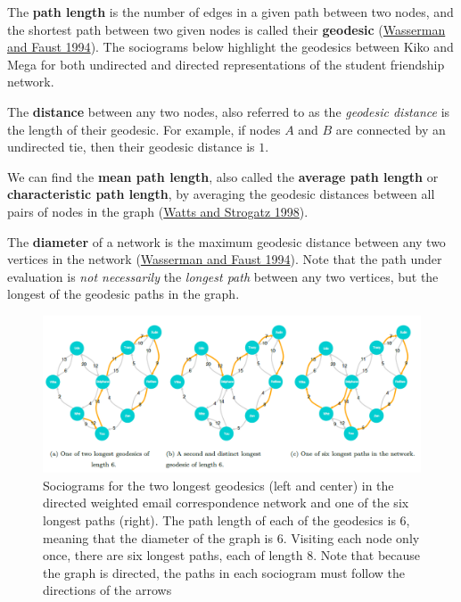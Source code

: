 \documentclass{book}
\begin{document}
The \textbf{path length} is the number of edges in a given path between two
nodes, and the shortest path between two given nodes is called their
\textbf{geodesic} (\protect\hyperlink{ref-WassermanFaust1994}{Wasserman and
Faust 1994}). The sociograms below highlight the geodesics between Kiko and
Mega for both undirected and directed representations of the student
friendship network.

The \textbf{distance} between any two nodes, also referred to as the
\emph{geodesic distance} is the length of their geodesic. For example, if
nodes \(A\) and \(B\) are connected by an undirected tie, then their geodesic
distance is \(1\).

We can find the \textbf{mean path length}, also called the \textbf{average
path length} or \textbf{characteristic path length}, by averaging the geodesic
distances between all pairs of nodes in the graph
(\protect\hyperlink{ref-WattsStrogatz1998}{Watts and Strogatz 1998}).

The \textbf{diameter} of a network is the maximum geodesic distance between
any two vertices in the network
(\protect\hyperlink{ref-WassermanFaust1994}{Wasserman and Faust 1994}). Note
that the path under evaluation is \emph{not necessarily} the \emph{longest
path} between any two vertices, but the longest of the geodesic paths in the
graph.

\begin{figure}
\centering
\includegraphics{images/social-networks/11-5.png}
\caption{Sociograms for the two longest geodesics (left and center) in the
directed weighted email correspondence network and one of the six longest
paths (right). The path length of each of the geodesics is 6, meaning that the
diameter of the graph is 6. Visiting each node only once, there are six
longest paths, each of length 8. Note that because the graph is directed, the
paths in each sociogram must follow the directions of the arrows}
\end{figure}
\end{document}
